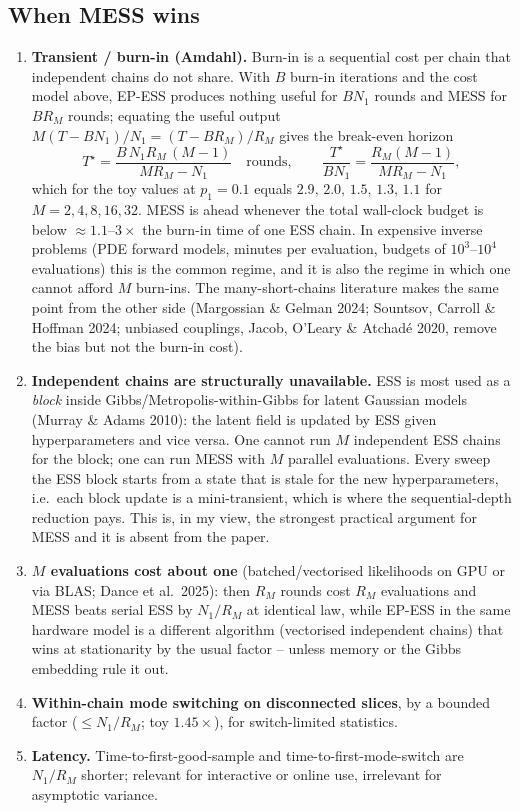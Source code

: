 \documentclass[11pt,a4paper]{article}
\theoremstyle{remark}
\begin{document}
\subsection{When MESS wins}\label{sec:wins}
\begin{enumerate}[leftmargin=*]
\item \textbf{Transient / burn-in (Amdahl).} Burn-in is a sequential cost per chain that independent chains do not share. With $B$ burn-in iterations and the cost model above, EP-ESS produces nothing useful for $BN_1$ rounds and MESS for $BR_M$ rounds; equating the useful output $M(T-BN_1)/N_1=(T-BR_M)/R_M$ gives the break-even horizon
\[
T^\star=\frac{B\,N_1R_M\,(M-1)}{MR_M-N_1}\quad\text{rounds},\qquad
\frac{T^\star}{BN_1}=\frac{R_M(M-1)}{MR_M-N_1},
\]
which for the toy values at $p_1=0.1$ equals $2.9,\,2.0,\,1.5,\,1.3,\,1.1$ for $M=2,4,8,16,32$.
MESS is ahead whenever the total wall-clock budget is below $\approx1.1$--$3\times$ the burn-in time of one ESS chain. In expensive inverse problems (PDE forward models, minutes per evaluation, budgets of $10^3$--$10^4$ evaluations) this is the common regime, and it is also the regime in which one cannot afford $M$ burn-ins. The many-short-chains literature makes the same point from the other side (Margossian \& Gelman 2024; Sountsov, Carroll \& Hoffman 2024; unbiased couplings, Jacob, O'Leary \& Atchad\'e 2020, remove the bias but not the burn-in cost).
\item \textbf{Independent chains are structurally unavailable.} ESS is most used as a \emph{block} inside Gibbs/Metropolis-within-Gibbs for latent Gaussian models (Murray \& Adams 2010): the latent field is updated by ESS given hyperparameters and vice versa. One cannot run $M$ independent ESS chains for the block; one can run MESS with $M$ parallel evaluations. Every sweep the ESS block starts from a state that is stale for the new hyperparameters, i.e.\ each block update is a mini-transient, which is where the sequential-depth reduction pays. This is, in my view, the strongest practical argument for MESS and it is absent from the paper.
\item \textbf{$M$ evaluations cost about one} (batched/vectorised likelihoods on GPU or via BLAS; Dance et al.\ 2025): then $R_M$ rounds cost $R_M$ evaluations and MESS beats serial ESS by $N_1/R_M$ at identical law, while EP-ESS in the same hardware model is a different algorithm (vectorised independent chains) that wins at stationarity by the usual factor -- unless memory or the Gibbs embedding rule it out.
\item \textbf{Within-chain mode switching on disconnected slices}, by a bounded factor ($\le N_1/R_M$; toy $1.45\times$), for switch-limited statistics.
\item \textbf{Latency.} Time-to-first-good-sample and time-to-first-mode-switch are $N_1/R_M$ shorter; relevant for interactive or online use, irrelevant for asymptotic variance.
\end{enumerate}
\end{document}
